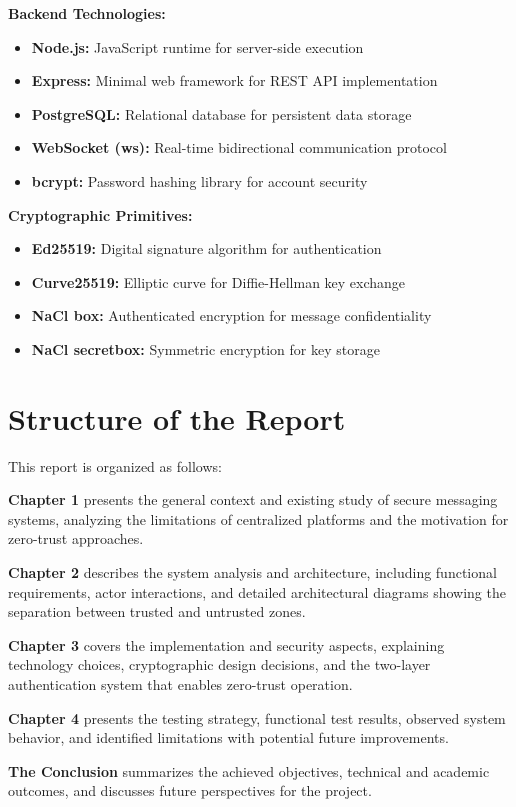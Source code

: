 \textbf{Backend Technologies:}
\begin{itemize}
    \item \textbf{Node.js:} JavaScript runtime for server-side execution
    \item \textbf{Express:} Minimal web framework for REST API implementation
    \item \textbf{PostgreSQL:} Relational database for persistent data storage
    \item \textbf{WebSocket (ws):} Real-time bidirectional communication protocol
    \item \textbf{bcrypt:} Password hashing library for account security
\end{itemize}

\textbf{Cryptographic Primitives:}
\begin{itemize}
    \item \textbf{Ed25519:} Digital signature algorithm for authentication
    \item \textbf{Curve25519:} Elliptic curve for Diffie-Hellman key exchange
    \item \textbf{NaCl box:} Authenticated encryption for message confidentiality
    \item \textbf{NaCl secretbox:} Symmetric encryption for key storage
\end{itemize}

\section*{Structure of the Report}

This report is organized as follows:

\textbf{Chapter 1} presents the general context and existing study of secure messaging systems, analyzing the limitations of centralized platforms and the motivation for zero-trust approaches.

\textbf{Chapter 2} describes the system analysis and architecture, including functional requirements, actor interactions, and detailed architectural diagrams showing the separation between trusted and untrusted zones.

\textbf{Chapter 3} covers the implementation and security aspects, explaining technology choices, cryptographic design decisions, and the two-layer authentication system that enables zero-trust operation.

\textbf{Chapter 4} presents the testing strategy, functional test results, observed system behavior, and identified limitations with potential future improvements.

\textbf{The Conclusion} summarizes the achieved objectives, technical and academic outcomes, and discusses future perspectives for the project.

